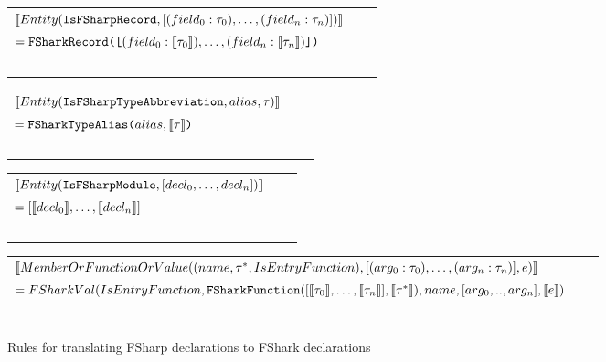 \begin{figure}
  \begin{framed}
    
  \centering
\begin{tabular}{@{}l c l}%
  $\llbracket Entity(\text{\ttfamily IsFSharpRecord}, [(field_0 : \tau_0), \ldots, (field_n : \tau_n)]) \rrbracket$ & & \\
  $= \lit{FSharkRecord([}(field_0 : \evals{\tau_0}), \ldots, (field_n : \evals{\tau_n})\lit{])}$ & & \\
  ~ \\
\end{tabular}
\begin{tabular}{@{}l c l}%
  $\llbracket Entity(\text{\ttfamily IsFSharpTypeAbbreviation}, alias, \tau) \rrbracket$ & & \\
  $= \lit{FSharkTypeAlias(} alias, \evals{\tau}\lit{)}$ & & \\
  ~ \\
\end{tabular}
\begin{tabular}{@{}l c l}%
  $\llbracket Entity(\text{\ttfamily IsFSharpModule}, [decl_0,\ldots,decl_n]) \rrbracket$ & & \\
  $= [\llbracket decl_0 \rrbracket,\ldots,\llbracket decl_n \rrbracket]$ & & \\
  ~ \\
\end{tabular}
\begin{tabular}{@{}l c l}%
  $\llbracket MemberOrFunctionOrValue((name, \tau^{*}, IsEntryFunction), [(arg_0 : \tau_0), \ldots, (arg_n : \tau_n)], e) \rrbracket$ & & \\
  $= FSharkVal(IsEntryFunction, \lit{FSharkFunction}([\evals{\tau_0}, \ldots, \evals{\tau_n}], \evals{\tau^{*}}),name, [arg_0,..,arg_n],\evals{e})$ & & \\
  ~ \\
\end{tabular}
\caption{Rules for translating FSharp declarations to FShark
    declarations}
  \end{framed}

\end{figure}


